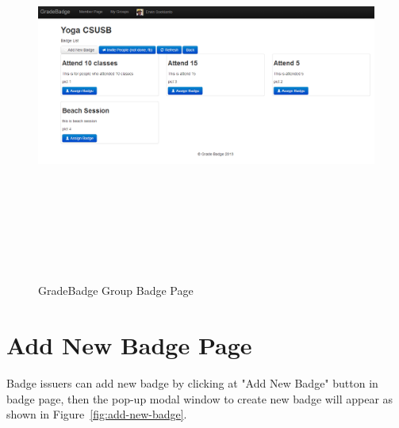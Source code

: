 \vspace{3em}
\begin{figure}[H]
\begin{center}
\includegraphics[height=5.1in,width=5.5in]{images/badge-page.png}
\caption{GradeBadge Group Badge Page}
\label{fig:group-badge}
\end{center}
\end{figure}

\newpage
\section{Add New Badge Page}
Badge issuers can add new badge by clicking at "Add New Badge" button in badge page, then the pop-up modal window to create new badge will appear  as shown in Figure~\ref{fig:add-new-badge}. 

